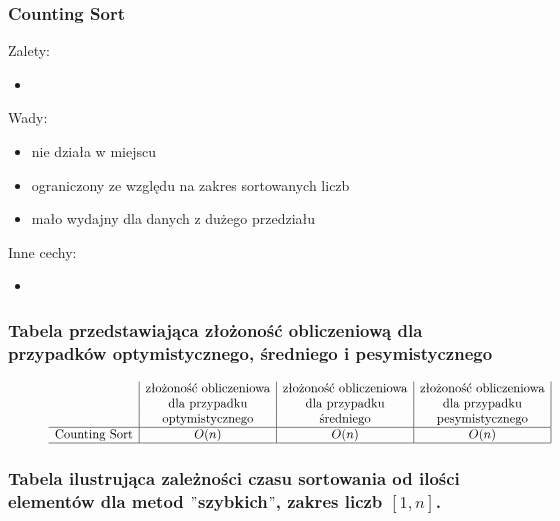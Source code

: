 \documentclass[polish,polish,a4paper]{article}
\begin{document}
\begin{spacing}{1.5}
			\subsubsection*{Counting Sort}
Zalety:
\begin{itemize}
	\item 
\end{itemize}
Wady:
\begin{itemize}
	\item nie działa w miejscu
	\item ograniczony ze względu na zakres sortowanych liczb
	\item mało wydajny dla danych z dużego przedziału
\end{itemize}
Inne cechy:
\begin{itemize}
	\item 
\end{itemize}

\subsubsection*{Tabela przedstawiająca złożoność obliczeniową dla przypadków optymistycznego, średniego i pesymistycznego} 
\begin{figure}[H]
	
	\begin{equation*}
	\begin{array}{l|c|c|c|}

	&$złożoność obliczeniowa$&$złożoność obliczeniowa$&$złożoność obliczeniowa$\\
	&$dla przypadku$&$dla przypadku$&$dla przypadku$\\
	&$optymistycznego$&$średniego$&$pesymistycznego$\\
	\hline
	$Counting Sort$&O(n)&O(n)&O(n)\\
	\hline
	\end{array}
	\end{equation*}
\end{figure}

	\subsubsection*{Tabela ilustrująca zależności czasu sortowania od ilości elementów dla metod $"$szybkich$"$, zakres liczb $ [1,n] $.}

\begin{figure}[H]
	\begin{equation*}
	\begin{array}{l|c|c|c|c|}
	

\end{array}
\end{equation*}
\end{figure}
\end{spacing}
\end{document}
